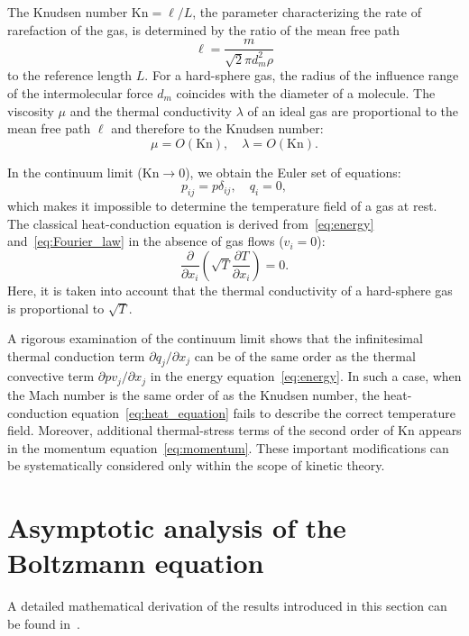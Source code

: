 \documentclass[smallextended]{svjour3} %
\newcommand{\Kn}{\mathrm{Kn}}
\newcommand{\pder}[2][]{\frac{\partial#1}{\partial#2}}
\newcommand{\Pder}[2][]{\partial#1/\partial#2}
\begin{document}
The Knudsen number \(\Kn = \ell/L\), the parameter characterizing the rate of rarefaction of the gas,
is determined by the ratio of the mean free path \[ \ell = \frac{m}{\sqrt2\pi d_m^2 \rho} \]
to the reference length \(L\).
For a hard-sphere gas, the radius of the influence range of the intermolecular force \(d_m\)
coincides with the diameter of a molecule.
The viscosity \(\mu\) and the thermal conductivity \(\lambda\) of an ideal gas
are proportional to the mean free path \(\ell\) and therefore to the Knudsen number:
\begin{equation}
    \mu = O(\Kn), \quad \lambda = O(\Kn).
\end{equation}

In the continuum limit (\(\Kn\to0\)), we obtain the Euler set of equations:
\begin{equation}
    p_{ij} = p\delta_{ij}, \quad q_i = 0,
\end{equation}
which makes it impossible to determine the temperature field of a gas at rest.
The classical heat-conduction equation is derived from~\eqref{eq:energy} and~\eqref{eq:Fourier_law}
in the absence of gas flows (\(v_i = 0\)):
\begin{equation}\label{eq:heat_equation}
    \pder{x_i}\left(\sqrt{T}\pder[T]{x_i}\right) = 0.
\end{equation}
Here, it is taken into account that the thermal conductivity of a hard-sphere gas
is proportional to \(\sqrt{T}\).

A rigorous examination of the continuum limit shows that the infinitesimal thermal conduction term \(\Pder[q_j]{x_j}\)
can be of the same order as the thermal convective term \(\Pder[pv_j]{x_j}\) in the energy equation~\eqref{eq:energy}.
In such a case, when the Mach number is the same order of as the Knudsen number,
the heat-conduction equation~\eqref{eq:heat_equation} fails to describe
the correct temperature field. Moreover, additional thermal-stress terms of the second order of \(\Kn\)
appears in the momentum equation~\eqref{eq:momentum}.
These important modifications can be systematically considered only within the scope of kinetic theory.

\section{Asymptotic analysis of the Boltzmann equation}

A detailed mathematical derivation of the results introduced in this section
can be found in~\cite{Sone2002, Sone2007}.
\end{document}

